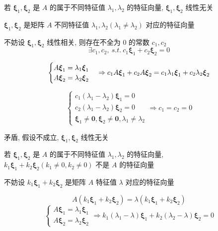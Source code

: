 \begin{corollary}[特征向量]
	\begin{proposition}
		若 $\boldsymbol{\xi}_{1},\boldsymbol{\xi}_{2}$ 是 $A$ 的属于不同特征值 $\lambda_{1},\lambda_{2}$ 的特征向量, $\boldsymbol{\xi}_{1},\boldsymbol{\xi}_{2}$ 线性无关
	\end{proposition}
	\begin{anymark}[证明]
		$\boldsymbol{\xi}_{1}, \boldsymbol{\xi}_{2}$ 是矩阵 $A$ 不同特征值 $\lambda_{1}, \lambda_{2} (\lambda_{1}\neq \lambda_{2})$ 对应的特征向量
		
		不妨设 $\boldsymbol{\xi}_{1}, \boldsymbol{\xi}_{2}$ 线性相关, 则存在不全为 $0$ 的常数 $c_{1}, c_{2}$
		$$\exists c_{1},c_{2},\ s.t.\ c_{1}\boldsymbol{\xi}_{1} + c_{2}\boldsymbol{\xi}_{2} = 0$$

		$$\begin{cases}
			A\boldsymbol{\xi}_{1} = \lambda_{1}\boldsymbol{\xi}_{1}\\
			A\boldsymbol{\xi}_{2} = \lambda_{2}\boldsymbol{\xi}_{2}
		\end{cases}\Rightarrow 
		c_{1}A\boldsymbol{\xi}_{1} + c_{2}A\boldsymbol{\xi}_{2} = c_{1}\lambda_{1}\boldsymbol{\xi}_{1} + c_{2}\lambda_{2}\boldsymbol{\xi}_{2}\\$$

		$$\begin{cases}
		  c_{1}(\lambda_{1} - \lambda_{2})\boldsymbol{\xi}_{1} = 0\\
		  c_{2}(\lambda_{1} - \lambda_{2})\boldsymbol{\xi}_{2} = 0\\
		  \boldsymbol{\xi}_{1} \neq \boldsymbol{0}, \boldsymbol{\xi}_{2} \neq \boldsymbol{0}, \lambda_{1} \neq \lambda_{2}
		\end{cases}\Rightarrow c_{1} = c_{2} = 0$$

		矛盾, 假设不成立, $\boldsymbol{\xi}_{1}, \boldsymbol{\xi}_{2}$ 线性无关
	\end{anymark}

	\begin{proposition}
		若 $\boldsymbol{\xi}_{1},\boldsymbol{\xi}_{2}$ 是 $A$ 的属于不同特征值 $\lambda_{1},\lambda_{2}$ 的特征向量, 
		$k_{1}\boldsymbol{\xi}_{1} + k_{2}\boldsymbol{\xi}_{2}(k_{1}\neq 0, k_{2}\neq 0)$ 不是 $A$ 的特征向量
	\end{proposition}
	\begin{anymark}[证明]
		不妨设 $k_{1}\boldsymbol{\xi}_{1} + k_{2}\boldsymbol{\xi}_{2}$ 是矩阵 $A$ 特征值 $\lambda$ 对应的特征向量

		$$A(k_{1}\boldsymbol{\xi}_{1} + k_{2}\boldsymbol{\xi}_{2}) = \lambda (k_{1}\boldsymbol{\xi}_{1} + k_{2}\boldsymbol{\xi}_{2})$$
		$$\begin{cases}
			A\boldsymbol{\xi}_{1} = \lambda_{1}\boldsymbol{\xi}_{1}\\
			A\boldsymbol{\xi}_{2} = \lambda_{2}\boldsymbol{\xi}_{2}
		\end{cases}\Rightarrow
		k_{1}(\lambda_{1} - \lambda)\boldsymbol{\xi}_{1} + k_{2}(\lambda_{2} - \lambda)\boldsymbol{\xi}_{2} = 0$$


\end{anymark}
\end{corollary}
